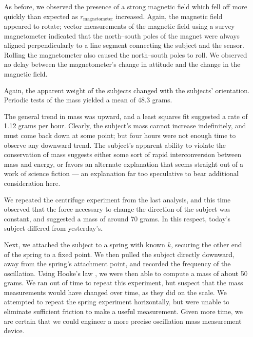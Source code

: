\documentclass[10pt]{article}
\begin{document}
As before, we observed the presence of a strong magnetic field which fell off more quickly than expected as $r_\textrm{magnetometer}$ increased.
Again, the magnetic field appeared to rotate; vector measurements of the magnetic field using a survey magnetometer indicated that the north--south poles of the magnet were always aligned perpendicularly to a line segment connecting the subject and the sensor.
Rolling the magnetometer also caused the north--south poles to roll.
We observed no delay between the magnetometer's change in attitude and the change in the magnetic field.

Again, the apparent weight of the subjects changed with the subjects' orientation.
Periodic tests of the mass yielded a mean of 48.3 grams.



The general trend in mass was upward, and a least squares fit suggested a rate of 1.12 grams per hour.
Clearly, the subject's mass cannot increase indefinitely, and must come back down at some point; but four hours were not enough time to observe any downward trend.
The subject's apparent ability to violate the conservation of mass suggests either some sort of rapid interconversion between mass and energy, or favors an alternate explanation that seems straight out of a work of science fiction --- an explanation far too speculative to bear additional consideration here.

We repeated the centrifuge experiment from the last analysis, and this time observed that the force necessary to change the direction of the subject was constant, and suggested a mass of around 70 grams.
In this respect, today's subject differed from yesterday's.

Next, we attached the subject to a spring with known $k$, securing the other end of the spring to a fixed point.
We then pulled the subject directly downward, away from the spring's attachment point, and recorded the frequency of the oscillation.
Using Hooke's law \citep{Hooke1679}, we were then able to compute a mass of about 50 grams.
We ran out of time to repeat this experiment, but suspect that the mass measurements would have changed over time, as they did on the scale.
We attempted to repeat the spring experiment horizontally, but were unable to eliminate sufficient friction to make a useful measurement.
Given more time, we are certain that we could engineer a more precise oscillation mass measurement device.
\end{document}
